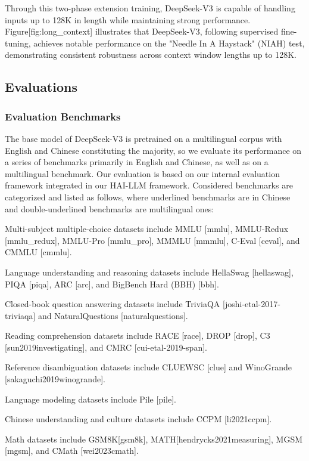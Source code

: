 \documentclass[11pt,a4paper]{article}
\begin{document}
Through this two-phase extension training, DeepSeek-V3 is capable of handling inputs up to 128K in length while maintaining strong performance. Figure[fig:long\_context] illustrates that DeepSeek-V3, following supervised fine-tuning, achieves notable performance on the "Needle In A Haystack" (NIAH) test, demonstrating consistent robustness across context window lengths up to 128K.

\subsection{Evaluations}

\subsubsection{Evaluation Benchmarks}

The base model of DeepSeek-V3 is pretrained on a multilingual corpus with English and Chinese constituting the majority, so we evaluate its performance on a series of benchmarks primarily in English and Chinese, as well as on a multilingual benchmark. Our evaluation is based on our internal evaluation framework integrated in our HAI-LLM framework. Considered benchmarks are categorized and listed as follows, where underlined benchmarks are in Chinese and double-underlined benchmarks are multilingual ones:

Multi-subject multiple-choice datasets include MMLU [mmlu], MMLU-Redux [mmlu\_redux], MMLU-Pro [mmlu\_pro], MMMLU [mmmlu], C-Eval [ceval], and CMMLU [cmmlu].

Language understanding and reasoning datasets include HellaSwag [hellaswag], PIQA [piqa], ARC [arc], and BigBench Hard (BBH) [bbh].

Closed-book question answering datasets include TriviaQA [joshi-etal-2017-triviaqa] and NaturalQuestions [naturalquestions].

Reading comprehension datasets include RACE [race], DROP [drop], C3 [sun2019investigating], and CMRC [cui-etal-2019-span].

Reference disambiguation datasets include CLUEWSC [clue] and WinoGrande [sakaguchi2019winogrande].

Language modeling datasets include Pile [pile].

Chinese understanding and culture datasets include CCPM [li2021ccpm].

Math datasets include GSM8K[gsm8k], MATH[hendrycks2021measuring], MGSM [mgsm], and CMath [wei2023cmath].
\end{document}
